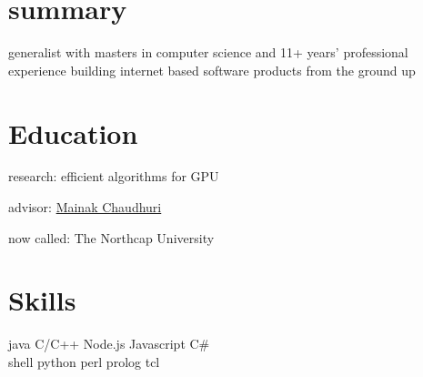 
\begin{minipage}[t]{0.32\textwidth} %

\section{summary}
\location{}
generalist with masters in computer science and 11+ years' professional experience building internet based software products from the ground up
\sectionspace %

\section{Education} 
\vspace{\topsep} %
\vspace{1pt}
\begin{tightitemize}
\item research: efficient algorithms for GPU
\item advisor: \href{https://www.cse.iitk.ac.in/users/mainakc/}{Mainak Chaudhuri} 
\end{tightitemize}
\vspace{6pt}

\begin{tightitemize}
\item now called: The Northcap University
\end{tightitemize}



\sectionspace %

\section{Skills}

java \textbullet{} C/C++ \textbullet{} Node.js \textbullet{} Javascript \textbullet{} C\#\\ 
shell \textbullet{} python \textbullet{} perl \textbullet{} prolog \textbullet{} tcl\\
\sectionspace %


\end{minipage}
